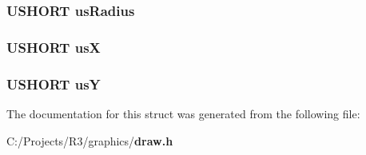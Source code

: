 \subsubsection[{usRadius}]{\setlength{\rightskip}{0pt plus 5cm}USHORT {\bf usRadius}}\label{struct_d_r_a_w___c_i_r_c_l_e___s_t_r_u_c_t_a6f1202ee52b34e09c03f9eb6802d805f}
\subsubsection[{usX}]{\setlength{\rightskip}{0pt plus 5cm}USHORT {\bf usX}}\label{struct_d_r_a_w___c_i_r_c_l_e___s_t_r_u_c_t_a6ead387c0c38c4f3f98aac147733a602}
\subsubsection[{usY}]{\setlength{\rightskip}{0pt plus 5cm}USHORT {\bf usY}}\label{struct_d_r_a_w___c_i_r_c_l_e___s_t_r_u_c_t_aeb96aa8e26a2ce680ec0e55e40f33a44}


The documentation for this struct was generated from the following file:\begin{DoxyCompactItemize}
\item 
C:/Projects/R3/graphics/{\bf draw.h}\end{DoxyCompactItemize}
